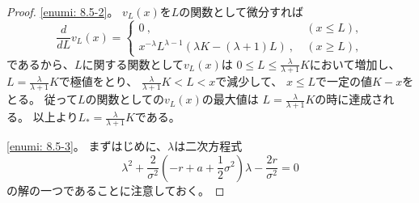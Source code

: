 \documentclass[uplatex]{jsarticle}
\theoremstyle{definition}
\begin{document}
\begin{proof}
  \ref{enumi: 8.5-2}。
  \(v_L(x)\)を\(L\)の関数として微分すれば
  \[
  \frac{d}{dL}v_L(x) =
  \begin{cases}
    0 \ , \ &(x \leq L), \\
    x^{-\lambda}L^{\lambda-1}
    \left(\lambda K - (\lambda + 1)L\right) \ , \ &(x \geq L),
  \end{cases}
  \]
  であるから、\(L\)に関する関数として\(v_L(x)\)は
  \(0\leq L \leq \frac{\lambda}{\lambda+1}K\)において増加し、
  \(L=\frac{\lambda}{\lambda+1}K\)で極値をとり、
  \(\frac{\lambda}{\lambda+1}K < L < x\)で減少して、
  \(x\leq L\)で一定の値\(K-x\)をとる。
  従って\(L\)の関数としての\(v_L(x)\)の最大値は
  \(L=\frac{\lambda}{\lambda+1}K\)の時に達成される。
  以上より\(L_*=\frac{\lambda}{\lambda+1}K\)である。

  \ref{enumi: 8.5-3}。
  まずはじめに、\(\lambda\)は二次方程式
  \[
  \lambda^2 + \frac{2}{\sigma^2}\left( -r+a+\frac{1}{2}\sigma^2\right)\lambda
  - \frac{2r}{\sigma^2} = 0
  \]
  の解の一つであることに注意しておく。


\end{proof}
\end{document}
